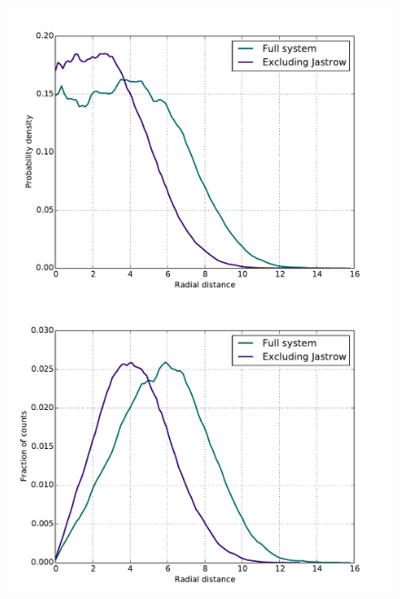 \documentclass[english, a4paper]{article}
\begin{document}
\begin{figure}
		{\includegraphics[scale=0.43]{figures/radialDistribution/OneBodyDensityN6w10Se7.pdf}}
		{\includegraphics[scale=0.43]{figures/radialDistribution/radialDistributionN6w10Se7.pdf}}
		

\end{figure}
\end{document}

